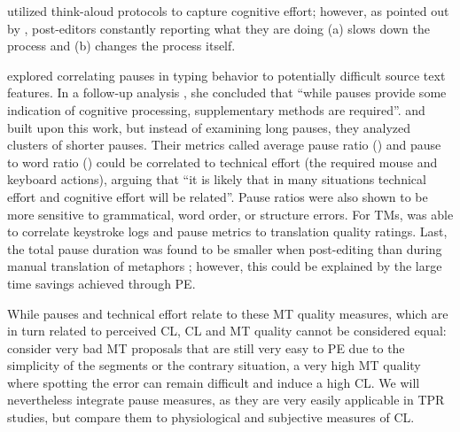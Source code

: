 \documentclass[output=paper]{langsci/langscibook}
\begin{document}
\citet{krings2001repairing} utilized think-aloud protocols to capture cognitive effort; however, as pointed out by \citet{o2005methodologies}, post-editors constantly reporting what they are doing (a) slows down the process and (b) changes the process itself.

\citet{o2005methodologies} explored correlating pauses in typing behavior to potentially difficult source text features. In a follow-up analysis \citep{o2006pauses}, she concluded that ``while pauses provide some indication of cognitive processing, supplementary methods are required''. %
\citet{lacruz2012average} and \citet{lacruz2014chapter} built upon this work, but instead of examining long pauses, they analyzed clusters of shorter pauses. Their metrics called average pause ratio (\apr{}) and pause to word ratio (\pwr{}) could be correlated to technical effort (the required mouse and keyboard actions), arguing that ``it is likely that in many situations technical effort and cognitive effort will be related''. Pause ratios were also shown to be more sensitive to grammatical, word order, or structure errors.
For TMs, \citet{mellinger2014computer} was able to correlate keystroke logs and pause metrics to translation quality ratings.
Last, the total pause duration was found to be smaller when post-editing than during manual translation of metaphors  \citep{koglin2015empirical}; however, this could be explained by the large time savings achieved through PE.

While pauses and technical effort relate to these MT quality measures, which are in turn related to perceived CL, CL and MT quality cannot be considered equal: consider very bad MT proposals that are still very easy to PE due to the simplicity of the segments or the contrary situation, a very high MT quality where spotting the error can remain difficult and induce a high CL. We will nevertheless integrate pause measures, as they are very easily applicable in TPR studies, but compare them to physiological and subjective measures of CL.
\end{document}
